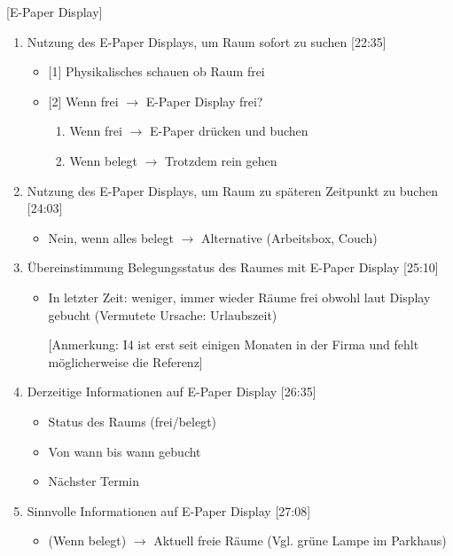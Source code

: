 [E-Paper Display]

\begin{enumerate}

    \item Nutzung des E-Paper Displays, um Raum sofort zu suchen [22:35]
    \begin{itemize}
        \item{} [1] Physikalisches schauen ob Raum frei 
        \item{} [2] Wenn frei $\rightarrow$ E-Paper Display frei? 
        \begin{enumerate}
            \item Wenn frei $\rightarrow$ E-Paper drücken und buchen
            \item Wenn belegt $\rightarrow$ Trotzdem rein gehen
        \end{enumerate}
    \end{itemize}
    
    \item Nutzung des E-Paper Displays, um Raum zu späteren Zeitpunkt zu buchen [24:03]
    \begin{itemize}
        \item Nein, wenn alles belegt $\rightarrow$ Alternative (Arbeitsbox, Couch)
    \end{itemize}
    
    \item Übereinstimmung Belegungsstatus des Raumes mit E-Paper Display [25:10] 
    \begin{itemize}
        \item In letzter Zeit: weniger, immer wieder Räume frei obwohl laut Display gebucht (Vermutete Ursache: Urlaubszeit)
        \item[] [Anmerkung: I4 ist erst seit einigen Monaten in der Firma und fehlt möglicherweise die Referenz]
    \end{itemize}
    
    \item Derzeitige Informationen auf E-Paper Display [26:35]
    \begin{itemize}
        \item Status des Raums (frei/belegt)
        \item Von wann bis wann gebucht
        \item Nächster Termin
    \end{itemize}
    
    \item Sinnvolle Informationen auf E-Paper Display [27:08]
    \begin{itemize}
        \item (Wenn belegt) $\rightarrow$ Aktuell freie Räume (Vgl. grüne Lampe im Parkhaus)
    \end{itemize}
    
\end{enumerate}

